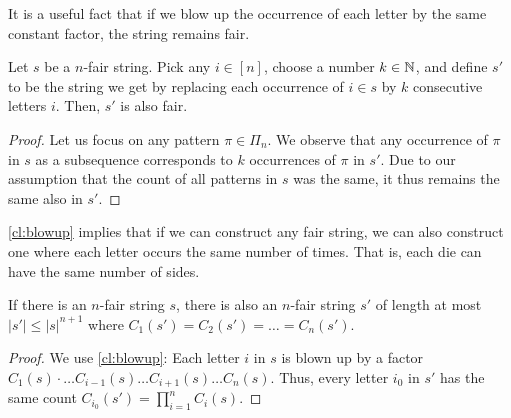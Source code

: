 \documentclass{article}
\begin{document}
It is a useful fact that if we blow up the occurrence of each letter by the same constant factor, the string remains fair. 
\begin{claim}
\label{cl:blowup}
    Let $s$ be a $n$-fair string. Pick any $i \in [n]$, choose a number $k \in \mathbb{N}$, and define $s'$ to be the string we get by replacing each occurrence of $i \in s$ by $k$ consecutive letters $i$. Then, $s'$ is also fair. 
\end{claim}
\begin{proof}
Let us focus on any pattern $\pi \in \Pi_n$. We observe that any occurrence of $\pi$ in $s$ as a subsequence corresponds to $k$ occurrences of $\pi$ in $s'$. Due to our assumption that the count of all patterns in $s$ was the same, it thus remains the same also in $s'$.  
\end{proof}

\cref{cl:blowup} implies that if we can construct any fair string, we can also construct one where each letter occurs the same number of times. That is, each die can have the same number of sides. 

\begin{corollary}
    \label{cor:same}
If there is an $n$-fair string $s$, there is also an $n$-fair string $s'$ of length at most $|s'| \le |s|^{n+1}$ where $C_1(s') = C_2(s') = \dots = C_n(s')$. 
\end{corollary}
\begin{proof}
We use \cref{cl:blowup}: Each letter $i$ in $s$ is blown up by a factor $C_1(s) \cdot \dots C_{i-1}(s) \dots C_{i+1}(s) \dots C_n(s)$. Thus, every letter $i_0$ in $s'$ has the same count $C_{i_0}(s') = \prod_{i = 1}^n C_i(s)$. 
\end{proof}
\end{document}
